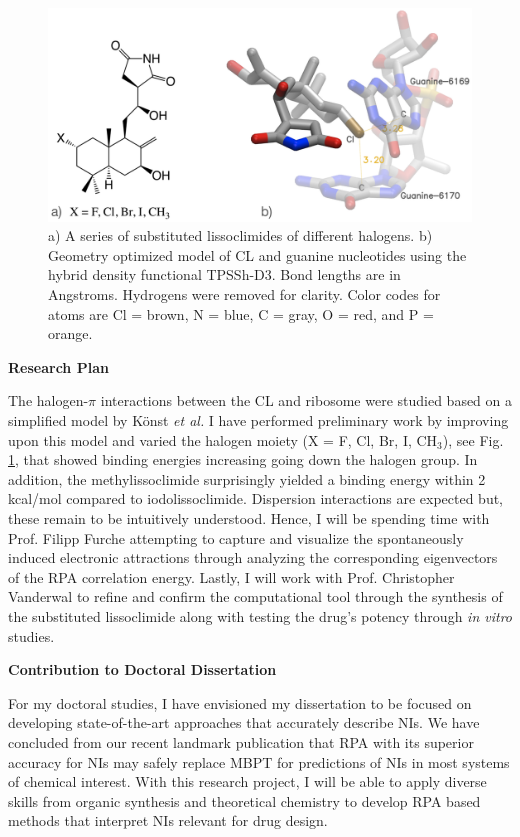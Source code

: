 \documentclass[11pt]{article}
\begin{document}
\begin{figure}
  \vspace{-20pt}
  \centering
  \includegraphics[scale=0.12]{combined.png}
  \caption{a) A series of substituted lissoclimides of different halogens.
    b) Geometry optimized model of CL and guanine nucleotides using the hybrid
    density functional TPSSh-D3.\autocite{Staroverov03JChemPhys119p12129,Grimme12ChemEurJ18p9955}
    Bond lengths are in Angstroms. Hydrogens were removed for clarity. Color codes
    for atoms are Cl = brown, N = blue, C = gray, O = red, and P = orange.\vspace{-11pt}}
  \label{fig:model}
\end{figure}

\textbf{Research Plan}

The halogen-$\pi$ interactions between the CL and ribosome were
studied based on a simplified model by K{\"o}nst \textit{et al.}\autocite{Konst2017}
I have performed preliminary work by improving upon this model and
varied the halogen moiety (X = F, Cl, Br, I, CH$_3$), see Fig. \ref{fig:model},
that showed binding energies increasing going down the halogen group. In addition,
the methylissoclimide surprisingly yielded a binding energy within 2
kcal/mol compared to iodolissoclimide. Dispersion interactions are expected
but, these remain to be intuitively understood. Hence, I will be spending time with
Prof. Filipp Furche attempting to capture and visualize the spontaneously induced
electronic attractions through analyzing the corresponding eigenvectors of the RPA
correlation energy. Lastly, I will work with Prof. Christopher Vanderwal to refine
and confirm the computational tool through the synthesis of the substituted lissoclimide
along with testing the drug's potency through \textit{in vitro} studies.

\textbf{Contribution to Doctoral Dissertation}

For my doctoral studies, I have envisioned my dissertation
to be focused on developing state-of-the-art approaches that accurately
describe NIs. We have concluded from our recent landmark publication that
RPA with its superior accuracy for NIs may safely replace MBPT for predictions
of NIs in most systems of chemical interest.\autocite{Nguyen20JChemTheoryComput16p2258}
With this research project, I will be able to apply diverse skills from
organic synthesis and theoretical chemistry to develop RPA based methods
that interpret NIs relevant for drug design.

\printbibliography
\end{document}
